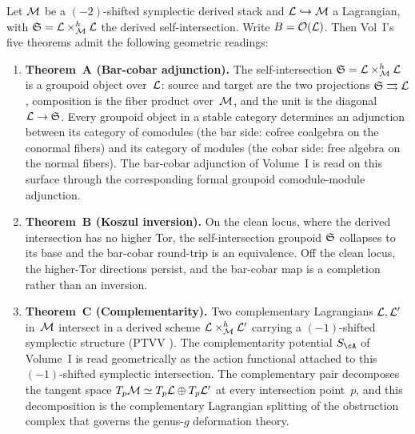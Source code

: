 \begin{interpretation}
\label{prop:five-theorems-geometry}
Let\/ $\mathcal M$ be a $(-2)$-shifted symplectic derived stack and\/
$\mathcal L \hookrightarrow \mathcal M$ a Lagrangian, with\/
$\mathfrak{S} = \mathcal L \times_{\mathcal M}^h \mathcal L$ the derived self-intersection.
Write\/ $B = \mathcal{O}(\mathcal L)$. Then Vol~I's five theorems admit the
following geometric readings:
\begin{enumerate}[label=\textup{(\roman*)},leftmargin=2em]
\item \textbf{Theorem~A \textup{(}Bar-cobar adjunction\textup{)}.}
 The self-intersection\/ $\mathfrak{S} = \mathcal L \times_{\mathcal M}^h \mathcal L$ is a
 groupoid object over~$\mathcal L$: source and target are the two
 projections $\mathfrak{S} \rightrightarrows \mathcal L$, composition is the
 fiber product over~$\mathcal M$, and the unit is the diagonal
 $\mathcal L \to \mathfrak{S}$. Every groupoid object in a stable category
 determines an adjunction between its category of comodules\/
 \textup{(}the bar side: cofree coalgebra on the conormal
 fibers\textup{)} and its category of modules\/
 \textup{(}the cobar side: free algebra on the normal
 fibers\textup{)}. The bar-cobar adjunction of Volume~I is
 read on this surface through the corresponding formal
 groupoid comodule-module adjunction.

\item \textbf{Theorem~B \textup{(}Koszul inversion\textup{)}.}
 On the clean locus, where the derived intersection has no
 higher Tor, the self-intersection groupoid\/
 $\mathfrak{S}$ collapses to its base and the bar-cobar round-trip
 is an equivalence. Off the clean locus, the higher-Tor
 directions persist, and the bar-cobar map is a
 completion rather than an inversion.

\item \textbf{Theorem~C \textup{(}Complementarity\textup{)}.}
 Two complementary Lagrangians\/ $\mathcal L, \mathcal L'$ in~$\mathcal M$ intersect
 in a derived scheme\/ $\mathcal L \times_{\mathcal M}^h \mathcal L'$ carrying a
 $(-1)$-shifted symplectic structure \textup{(}PTVV
 \cite{PTVV13}\textup{)}. The complementarity potential\/
 $S_{\cA}$ of Volume~I is read geometrically as the action
 functional attached to this $(-1)$-shifted symplectic
 intersection.
 The complementary pair decomposes the tangent space\/
 $T_p\mathcal M \simeq T_p\mathcal L \oplus T_p\mathcal L'$ at every intersection
 point~$p$, and this decomposition is the complementary
 Lagrangian splitting of the obstruction complex that governs the
 genus-$g$ deformation theory.


\end{enumerate}
\end{interpretation}

